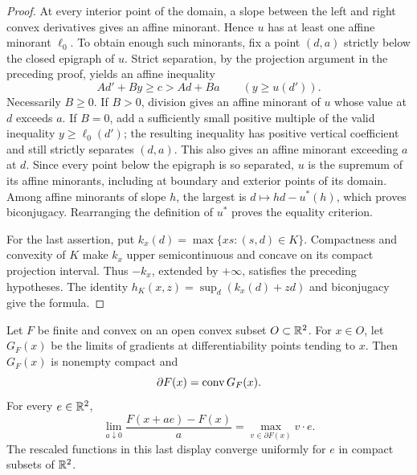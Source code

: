 \begin{proof}
At every interior point of the domain, a slope between the left and right
convex derivatives gives an affine minorant. Hence $u$ has at least one
affine minorant $\ell_0$. To obtain enough such minorants, fix a point
$(d,a)$ strictly below the closed epigraph of $u$. Strict separation, by
the projection argument in the preceding proof, yields an affine inequality
\[
 A d'+B y\ge c>A d+B a\qquad(y\ge u(d')).
\]
Necessarily $B\ge0$. If $B>0$, division gives an affine minorant of $u$
whose value at $d$ exceeds $a$. If $B=0$, add a sufficiently small positive
multiple of the valid inequality $y\ge\ell_0(d')$; the resulting
inequality has positive vertical coefficient and still strictly separates
$(d,a)$. This also gives an affine minorant exceeding $a$ at $d$.
Since every point below the epigraph is so separated, $u$ is the supremum
of its affine minorants, including at boundary and exterior points of its
domain. Among affine minorants of slope $h$, the largest is
$d\mapsto hd-u^*(h)$, which proves biconjugacy. Rearranging the definition
of $u^*$ proves the equality criterion.

For the last assertion, put
$k_x(d)=\max\{xs:(s,d)\in K\}$. Compactness and convexity of $K$ make
$k_x$ upper semicontinuous and concave on its compact projection interval.
Thus $-k_x$, extended by $+\infty$, satisfies the preceding hypotheses.
The identity $h_K(x,z)=\sup_d(k_x(d)+zd)$ and biconjugacy give the formula.
\end{proof}

\begin{lemma}\label{lem:reachable-local}
Let $F$ be finite and convex on an open convex subset $O\subset\mathbb R^2$.
For $x\in O$, let $G_F(x)$ be the limits of gradients at differentiability
points tending to $x$. Then $G_F(x)$ is nonempty compact and
\[
 \partial F(x)=\operatorname{conv} G_F(x).
\]
For every $e\in\mathbb R^2$,
\[
 \lim_{a\downarrow0}\frac{F(x+ae)-F(x)}a
 =\max_{v\in\partial F(x)}v\cdot e.
\]
The rescaled functions in this last display converge uniformly for $e$ in
compact subsets of $\mathbb R^2$.
\end{lemma}

